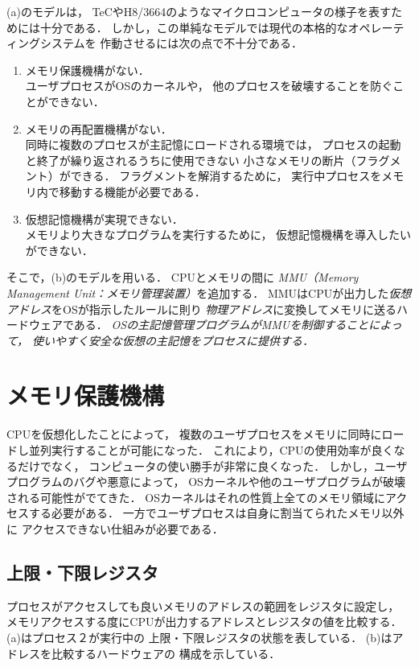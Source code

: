 (a)のモデルは，
TeCやH8/3664のようなマイクロコンピュータの様子を表すためには十分である．
しかし，この単純なモデルでは現代の本格的なオペレーティングシステムを
作動させるには次の点で不十分である．
\begin{enumerate}
\item メモリ保護機構がない．\\
ユーザプロセスがOSのカーネルや，
他のプロセスを破壊することを防ぐことができない．
\item メモリの再配置機構がない．\\
同時に複数のプロセスが主記憶にロードされる環境では，
プロセスの起動と終了が繰り返されるうちに使用できない
小さなメモリの断片（フラグメント）ができる．
フラグメントを解消するために，
実行中プロセスをメモリ内で移動する機能が必要である．
\item 仮想記憶機構が実現できない．\\
メモリより大きなプログラムを実行するために，
仮想記憶機構を導入したいができない．
\end{enumerate}

そこで，(b)のモデルを用いる．
CPUとメモリの間に
\emph{MMU（Memory Management Unit：メモリ管理装置）}を追加する．
MMUはCPUが出力した\emph{仮想アドレス}をOSが指示したルールに則り
\emph{物理アドレス}に変換してメモリに送るハードウェアである．
\emph{OSの主記憶管理プログラムがMMUを制御することによって，
使いやすく安全な仮想の主記憶をプロセスに提供する．}

\section{メモリ保護機構}
CPUを仮想化したことによって，
複数のユーザプロセスをメモリに同時にロードし並列実行することが可能になった．
これにより，CPUの使用効率が良くなるだけでなく，
コンピュータの使い勝手が非常に良くなった．
しかし，ユーザプログラムのバグや悪意によって，
OSカーネルや他のユーザプログラムが破壊される可能性がでてきた．
OSカーネルはそれの性質上全てのメモリ領域にアクセスする必要がある．
一方でユーザプロセスは自身に割当てられたメモリ以外に
アクセスできない仕組みが必要である．

\subsection{上限・下限レジスタ}
プロセスがアクセスしても良いメモリのアドレスの範囲をレジスタに設定し，
メモリアクセスする度にCPUが出力するアドレスとレジスタの値を比較する．
(a)はプロセス２が実行中の
上限・下限レジスタの状態を表している．
(b)はアドレスを比較するハードウェアの
構成を示している．

